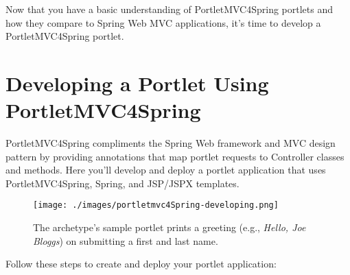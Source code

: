 Now that you have a basic understanding of PortletMVC4Spring portlets
and how they compare to Spring Web MVC applications, it's time to
develop a PortletMVC4Spring portlet.

\chapter{Developing a Portlet Using
PortletMVC4Spring}\label{developing-a-portlet-using-portletmvc4spring}

PortletMVC4Spring compliments the Spring Web framework and MVC design
pattern by providing annotations that map portlet requests to Controller
classes and methods. Here you'll develop and deploy a portlet
application that uses PortletMVC4Spring, Spring, and JSP/JSPX templates.

\begin{figure}
\centering
\texttt{[image: ./images/portletmvc4Spring-developing.png]}
\caption{The archetype's sample portlet prints a greeting (e.g.,
\emph{Hello, Joe Bloggs}) on submitting a first and last name.}
\end{figure}

Follow these steps to create and deploy your portlet application:

